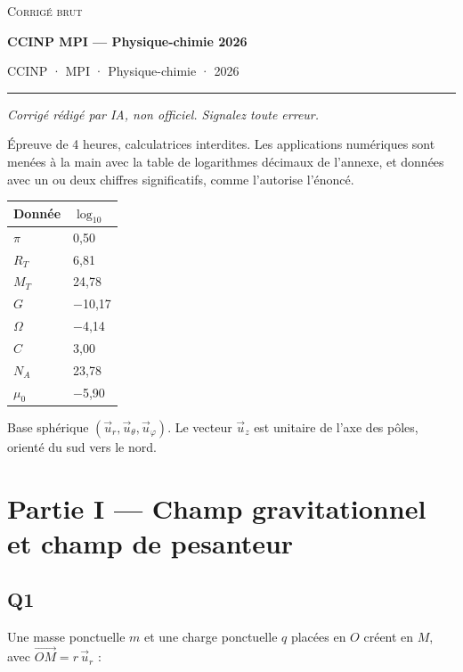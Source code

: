 \documentclass[11pt,a4paper]{article}
\begin{document}
\thispagestyle{plain}
\begin{center}
  {\small\scshape Corrigé brut}\par\smallskip
  {\LARGE\bfseries CCINP MPI — Physique-chimie 2026\par}\medskip
  {\large CCINP · MPI · Physique-chimie · 2026\par}
\end{center}
\vspace{2pt}\hrule\vspace{8pt}

\emph{Corrigé rédigé par IA, non officiel. Signalez toute erreur.}

Épreuve de 4 heures, calculatrices interdites. Les applications numériques sont menées à la main avec la table de logarithmes décimaux de l'annexe, et données avec un ou deux chiffres significatifs, comme l'autorise l'énoncé.

\begin{longtable}[]{@{}ll@{}}
\toprule\noalign{}
Donnée & \(\log_{10}\) \\
\midrule\noalign{}
\endhead
\bottomrule\noalign{}
\endlastfoot
\(\pi\) & 0,50 \\
\(R_T\) & 6,81 \\
\(M_T\) & 24,78 \\
\(G\) & −10,17 \\
\(\Omega\) & −4,14 \\
\(C\) & 3,00 \\
\(N_A\) & 23,78 \\
\(\mu_0\) & −5,90 \\
\end{longtable}

Base sphérique \((\vec u_r,\vec u_\theta,\vec u_\varphi)\). Le vecteur \(\vec u_z\) est unitaire de l'axe des pôles, orienté du sud vers le nord.

\hypertarget{partie-i-champ-gravitationnel-et-champ-de-pesanteur}{%
\section{Partie I --- Champ gravitationnel et champ de pesanteur}\label{partie-i-champ-gravitationnel-et-champ-de-pesanteur}}

\hypertarget{q1}{%
\subsection{Q1}\label{q1}}

Une masse ponctuelle \(m\) et une charge ponctuelle \(q\) placées en \(O\) créent en \(M\), avec \(\overrightarrow{OM}=r\,\vec u_r\) :
\end{document}
